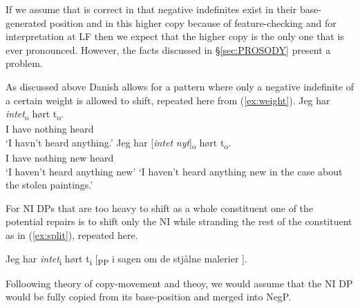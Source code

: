\documentclass[12pt, letterpaper]{article}
\begin{document}
If we assume that \citet{zeijlstraSyntacticallyComplexStatus2011} is correct in that negative indefinites exist in their base-generated position and in this higher copy because of feature-checking and for interpretation at LF then we expect that the higher copy is the only one that is ever pronounced. However, the facts discussed in §\ref{sec:PROSODY} present a problem. 

As discussed above Danish allows for a pattern where only a negative indefinite of a certain weight is allowed to shift, repeated here from (\ref{ex:weight}). 
	\ea
		\ea 
		\gll Jeg har \textit{intet}\textsubscript{o} hørt t\textsubscript{o}.\\
		I have nothing heard\\
		\glt  `I havn't heard anything.'
		\ex 
		\gll Jeg har [\textit{intet} \textit{nyt}]\textsubscript{o} hørt t\textsubscript{o}.\\
		I have nothing new heard\\
		\glt `I haven't heard anything new'
		\glt `I haven't heard anything new in the case about the stolen paintings.'
		\z 
	\z

For NI DPs that are too heavy to shift as a whole constituent one of the potential repairs is to shift only the NI while stranding the rest of the constituent as in (\ref{ex:split}), repeated here.

\ea Jeg har \textit{intet}\textsubscript{i} hørt t\textsubscript{i} [\textsubscript{PP} i sagen om de stjålne malerier ].
\z 

Folloowing  theory of copy-movement and  theoy, we would assume that the NI DP would be fully copied from its base-position and merged into NegP.
\end{document}
